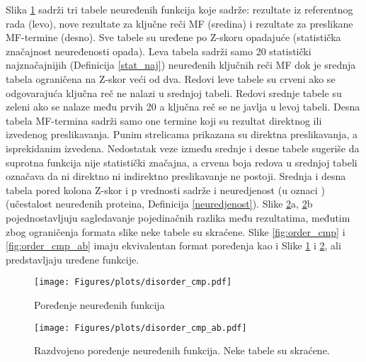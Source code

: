 Slika \ref{fig:disorder_cmp} sadrži tri tabele neuređenih funkcija koje sadrže:
rezultate iz referentnog rada (levo), nove rezultate za ključne reči MF
(sredina) i rezultate za preslikane MF-termine (desno). Sve tabele su uređene
po Z-skoru opadajuće (statistička značajnost neuređenosti opada).  Leva tabela
sadrži samo 20 statistički najznačajnijih (Definicija \ref{stat_naj})
neuređenih ključnih reči MF dok je srednja tabela ograničena na Z-skor veći od
dva.  Redovi leve tabele su crveni ako se odgovarajuća ključna reč ne nalazi u
srednjoj tabeli.  Redovi srednje tabele su zeleni ako se nalaze među prvih 20 a
ključna reč se ne javlja u levoj tabeli.  Desna tabela MF-termina sadrži samo
one termine koji su rezultat direktnog ili izvedenog preslikavanja.  Punim
strelicama prikazana su direktna preslikavanja, a isprekidanim izvedena.
Nedostatak veze između srednje i desne tabele sugeriše da suprotna funkcija
nije statistički značajna, a crvena boja redova u srednjoj tabeli označava da
ni direktno ni indirektno preslikavanje ne postoji.  Srednja i desna tabela
pored kolona Z-skor i p vrednosti sadrže i neuredjenost (u oznaci )
(učestalost neuređenih proteina, Definicija \ref{neuredjenost}).  Slike
\ref{fig:disorder_cmp_ab}a, \ref{fig:disorder_cmp_ab}b pojednostavljuju
sagledavanje pojedinačnih razlika među rezultatima, međutim zbog ograničenja
formata slike neke tabele su skraćene.  Slike \ref{fig:order_cmp} i
\ref{fig:order_cmp_ab}  imaju ekvivalentan format poređenja kao i Slike
\ref{fig:disorder_cmp} i \ref{fig:disorder_cmp_ab}, ali predstavljaju uređene
funkcije.



\clearpage

\begin{figure}[th]
\hspace*{-0.5cm} 
  \centering
\texttt{[image: Figures/plots/disorder\_cmp.pdf]}
\caption {
  Poređenje neuređenih funkcija
}
\label{fig:disorder_cmp}
\end{figure}

\clearpage

\begin{figure}[th]
  \centering
\texttt{[image: Figures/plots/disorder\_cmp\_ab.pdf]}
\caption {
  Razdvojeno poređenje neuređenih funkcija. Neke tabele su skraćene.
}
\label{fig:disorder_cmp_ab}
\end{figure}


